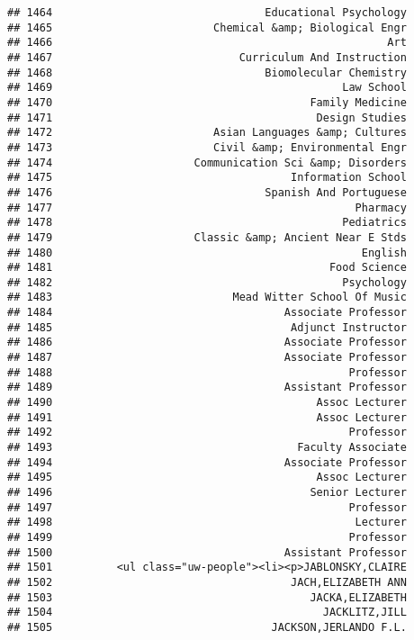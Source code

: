 \documentclass[
]{article}
\begin{document}
\begin{verbatim}
## 1464                                 Educational Psychology
## 1465                         Chemical &amp; Biological Engr
## 1466                                                    Art
## 1467                             Curriculum And Instruction
## 1468                                 Biomolecular Chemistry
## 1469                                             Law School
## 1470                                        Family Medicine
## 1471                                         Design Studies
## 1472                         Asian Languages &amp; Cultures
## 1473                         Civil &amp; Environmental Engr
## 1474                      Communication Sci &amp; Disorders
## 1475                                     Information School
## 1476                                 Spanish And Portuguese
## 1477                                               Pharmacy
## 1478                                             Pediatrics
## 1479                      Classic &amp; Ancient Near E Stds
## 1480                                                English
## 1481                                           Food Science
## 1482                                             Psychology
## 1483                            Mead Witter School Of Music
## 1484                                    Associate Professor
## 1485                                     Adjunct Instructor
## 1486                                    Associate Professor
## 1487                                    Associate Professor
## 1488                                              Professor
## 1489                                    Assistant Professor
## 1490                                         Assoc Lecturer
## 1491                                         Assoc Lecturer
## 1492                                              Professor
## 1493                                      Faculty Associate
## 1494                                    Associate Professor
## 1495                                         Assoc Lecturer
## 1496                                        Senior Lecturer
## 1497                                              Professor
## 1498                                               Lecturer
## 1499                                              Professor
## 1500                                    Assistant Professor
## 1501          <ul class="uw-people"><li><p>JABLONSKY,CLAIRE
## 1502                                     JACH,ELIZABETH ANN
## 1503                                        JACKA,ELIZABETH
## 1504                                          JACKLITZ,JILL
## 1505                                  JACKSON,JERLANDO F.L.

\end{verbatim}
\end{document}
